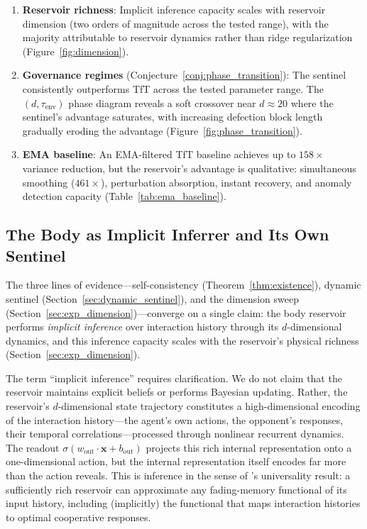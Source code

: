 \documentclass[11pt,a4paper]{article}
\theoremstyle{definition}
\newcommand{\Wout}{w_{\mathrm{out}}}
\newcommand{\xstate}{\mathbf{x}}
\newcommand{\bout}{b_{\mathrm{out}}}
\begin{document}
\begin{enumerate}[label=(\roman*)]
  \item \textbf{Reservoir richness}:
    Implicit inference capacity scales with reservoir dimension
    (two orders of magnitude across the tested range),
    with the majority attributable to reservoir dynamics rather than ridge
    regularization (Figure~\ref{fig:dimension}).

  \item \textbf{Governance regimes}
    (Conjecture~\ref{conj:phase_transition}):
    The sentinel consistently outperforms TfT across the tested
    parameter range.  The $(d, \tau_{\mathrm{env}})$ phase diagram
    reveals a soft crossover near $d \approx 20$ where the sentinel's
    advantage saturates, with increasing defection block length
    gradually eroding the advantage
    (Figure~\ref{fig:phase_transition}).

  \item \textbf{EMA baseline}:
    An EMA-filtered TfT baseline achieves up to $158\times$ variance
    reduction, but the reservoir's advantage is qualitative: simultaneous
    smoothing ($461\times$), perturbation absorption, instant recovery,
    and anomaly detection capacity (Table~\ref{tab:ema_baseline}).
\end{enumerate}

\subsection{The Body as Implicit Inferrer and Its Own Sentinel}

The three lines of evidence---self-consistency
(Theorem~\ref{thm:existence}), dynamic sentinel
(Section~\ref{sec:dynamic_sentinel}), and the dimension sweep
(Section~\ref{sec:exp_dimension})---converge on a single claim:
the body reservoir performs \emph{implicit inference} over interaction
history through its $d$-dimensional dynamics, and this inference capacity
scales with the reservoir's physical richness
(Section~\ref{sec:exp_dimension}).

The term ``implicit inference'' requires clarification.  We do not claim
that the reservoir maintains explicit beliefs or performs Bayesian updating.
Rather, the reservoir's $d$-dimensional state trajectory constitutes a
high-dimensional encoding of the interaction history---the agent's own
actions, the opponent's responses, their temporal correlations---processed
through nonlinear recurrent dynamics.  The readout $\sigma(\Wout \cdot
\xstate + \bout)$ projects this rich internal representation onto a
one-dimensional action, but the internal representation itself encodes
far more than the action reveals.  This is inference in the sense of
\citet{grigoryeva2018}'s universality result: a sufficiently rich reservoir
can approximate any fading-memory functional of its input history,
including (implicitly) the functional that maps interaction histories
to optimal cooperative responses.
\end{document}
